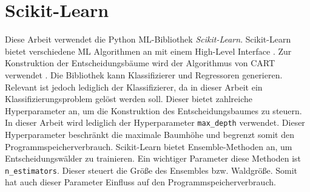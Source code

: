 \section{Scikit-Learn}
\label{sec:dt_scikit_learn}
Diese Arbeit verwendet die Python ML-Bibliothek \textit{Scikit-Learn}. Scikit-Learn bietet verschiedene ML Algorithmen an mit einem High-Level Interface \cite{scikit-learn}.
Zur Konstruktion der Entscheidungsbäume wird der Algorithmus von CART verwendet \cite{ScikitLearnCART}.
Die Bibliothek kann Klassifizierer und Regressoren generieren.
\newline
\newline
Relevant ist jedoch lediglich der Klassifizierer, da in dieser Arbeit ein Klassifizierungsproblem gelöst werden soll. Dieser bietet zahlreiche Hyperparameter an, um die Konstruktion des
Entscheidungsbaumes zu steuern. In dieser Arbeit wird lediglich der Hyperparameter \texttt{max\_depth} verwendet. Dieser Hyperparameter beschränkt die maximale Baumhöhe und begrenzt somit
den Programmspeicherverbrauch.
\newline
\newline
Scikit-Learn bietet Ensemble-Methoden an, um Entscheidungswälder zu trainieren. Ein wichtiger Parameter diese Methoden ist \texttt{n\_estimators}. Dieser steuert die Größe des Ensembles bzw.
Waldgröße. Somit hat auch dieser Parameter Einfluss auf den Programmspeicherverbrauch.
